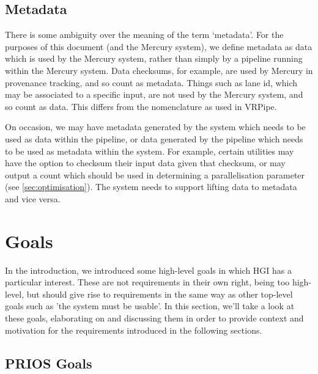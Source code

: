 \documentclass[10pt,a4paper]{article}
\newcommand{\npar}{\par\noindent\space}
\begin{document}
\subsection{Metadata}
\npar There is some ambiguity over the meaning of the term `metadata'. For the purposes of this document (and the Mercury system), we define metadata as data which is used by the Mercury system, rather than simply by a pipeline running within the Mercury system. Data checksums, for example, are used by Mercury in provenance tracking, and so count as metadata. Things such as lane id, which may be associated to a specific input, are not used by the Mercury system, and so count as data. This differs from the nomenclature as used in VRPipe.
\npar On occasion, we may have metadata generated by the system which needs to be used as data within the pipeline, or data generated by the pipeline which needs to be used as metadata within the system. For example, certain utilities may have the option to checksum their input data given that checksum, or may output a count which should be used in determining a parallelisation parameter (see \ref{sec:optimisation}). The system needs to support lifting data to metadata and vice versa.

\section{Goals}
\npar In the introduction, we introduced some high-level goals in which HGI has a particular interest. These are not requirements in their own right, being too high-level, but should give rise to requirements in the same way as other top-level goals such as 'the system must be usable'. In this section, we'll take a look at these goals, elaborating on and discussing them in order to provide context and motivation for the requirements introduced in the following sections.

\subsection{PRIOS Goals}
\end{document}
